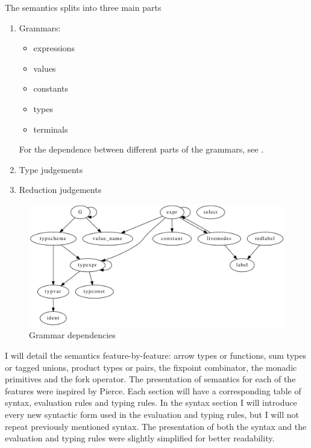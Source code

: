 \documentclass[12pt,twoside,notitlepage]{report}
\begin{document}
The semantics splits into three main parts
\begin{enumerate}
\item{Grammars:\begin{itemize}
\item{expressions}
\item{values}
\item{constants}
\item{types}
\item{terminals}
\end{itemize}
For the dependence between different parts of the grammars, see .}
\item{Type judgements}
\item{Reduction judgements}
\end{enumerate}
\begin{figure}[h]
\begin{center}
\includegraphics[width=\linewidth]{mconbaseOttdep}
\caption{Grammar dependencies}
\label{fig:grammardep}
\end{center}
\end{figure}

I will detail the semantics feature-by-feature: arrow types or functions, sum types or tagged unions, product types or pairs, the fixpoint combinator, the monadic primitives and the fork operator. The presentation of semantics for each of the features were inspired by Pierce\cite{pierce2002types}. Each section will have a corresponding table of syntax, evaluation rules and typing rules.  In the syntax section I will introduce every new syntactic form used in the evaluation and typing rules, but I will not repeat previously mentioned syntax. The presentation of both the syntax and the evaluation and typing rules were slightly simplified for better readability.  
\end{document}
